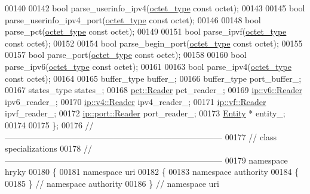\begin{DoxyCode}
00140 
00142     \textcolor{keywordtype}{bool} parse\_userinfo\_ipv4(\hyperlink{namespacehryky_a488cba8b666be33ccca70e819684e3c8}{octet_type} \textcolor{keyword}{const} octet);
00143 
00145     \textcolor{keywordtype}{bool} parse\_userinfo\_ipv4\_port(\hyperlink{namespacehryky_a488cba8b666be33ccca70e819684e3c8}{octet_type} \textcolor{keyword}{const} octet);
00146 
00148     \textcolor{keywordtype}{bool} parse\_pct(\hyperlink{namespacehryky_a488cba8b666be33ccca70e819684e3c8}{octet_type} \textcolor{keyword}{const} octet);
00149 
00151     \textcolor{keywordtype}{bool} parse\_ipvf(\hyperlink{namespacehryky_a488cba8b666be33ccca70e819684e3c8}{octet_type} \textcolor{keyword}{const} octet);
00152 
00154     \textcolor{keywordtype}{bool} parse\_begin\_port(\hyperlink{namespacehryky_a488cba8b666be33ccca70e819684e3c8}{octet_type} \textcolor{keyword}{const} octet);
00155 
00157     \textcolor{keywordtype}{bool} parse\_port(\hyperlink{namespacehryky_a488cba8b666be33ccca70e819684e3c8}{octet_type} \textcolor{keyword}{const} octet);
00158 
00160     \textcolor{keywordtype}{bool} parse\_ipv6(\hyperlink{namespacehryky_a488cba8b666be33ccca70e819684e3c8}{octet_type} \textcolor{keyword}{const} octet);
00161 
00163     \textcolor{keywordtype}{bool} parse\_ipv4(\hyperlink{namespacehryky_a488cba8b666be33ccca70e819684e3c8}{octet_type} \textcolor{keyword}{const} octet);
00164 
00165     buffer\_type         buffer\_;
00166     buffer\_type         port\_buffer\_;
00167     states\_type         states\_;
00168     \hyperlink{classhryky_1_1uri_1_1pct_1_1_reader}{pct::Reader}         pct\_reader\_;
00169     \hyperlink{classhryky_1_1ip_1_1v6_1_1_reader}{ip::v6::Reader}      ipv6\_reader\_;
00170     \hyperlink{classhryky_1_1ip_1_1v4_1_1_reader}{ip::v4::Reader}      ipv4\_reader\_;
00171     \hyperlink{classhryky_1_1ip_1_1vf_1_1_reader}{ip::vf::Reader}      ipvf\_reader\_;
00172     \hyperlink{classhryky_1_1ip_1_1port_1_1_reader}{ip::port::Reader}    port\_reader\_;
00173     \hyperlink{classhryky_1_1uri_1_1_entity}{Entity} *            entity\_;
00174 
00175 \};
00176 \textcolor{comment}{//
      ------------------------------------------------------------------------------}
00177 \textcolor{comment}{// class specializations}
00178 \textcolor{comment}{//
      ------------------------------------------------------------------------------}
00179 \textcolor{keyword}{namespace }hryky
00180 \{
00181 \textcolor{keyword}{namespace }uri
00182 \{
00183 \textcolor{keyword}{namespace }authority
00184 \{
00185 \} \textcolor{comment}{// namespace authority}
00186 \} \textcolor{comment}{// namespace uri}

\end{DoxyCode}

